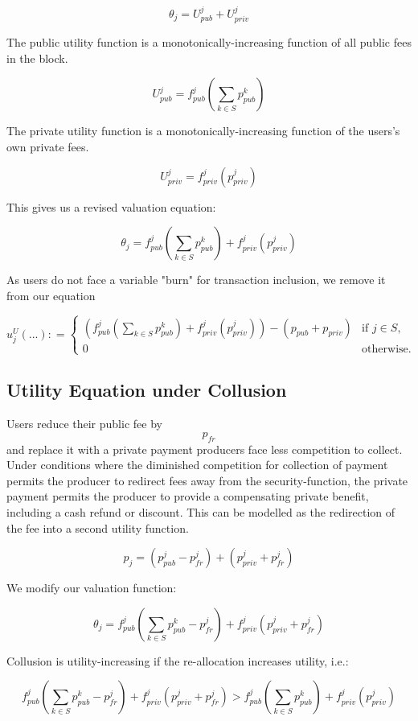 \documentclass[oneside]{article}   	%
\begin{document}
$$
\theta_j = U_{pub}^j + U_{priv}^j
$$

The public utility function is a monotonically-increasing function of all public fees in the block.

$$
U_{pub}^j = f_{pub}^j\left(\sum_{k \in S} p_{pub}^{k}\right)
$$

The private utility function is a monotonically-increasing function of the users's own private fees.

$$
U_{priv}^j = f_{priv}^j(p_{priv}^j)
$$

This gives us a revised valuation equation:

$$
\theta_j = f_{pub}^j\left(\sum_{k \in S} p_{pub}^{k}\right) + f_{priv}^j(p_{priv}^j)
$$

As users do not face a variable "burn" for transaction inclusion, we remove it from our equation

\[
u_j^U\left(...\right) : =
\begin{cases}
\left(
	f_{pub}^j
		\left(\sum_{k \in S} p_{pub}^{k}\right) 
		+ f_{priv}^j(p_{priv}^j) 
\right)  -   \left(p_{pub} + p_{priv}\right) & \text{if } j \in S, \\ 0 & \text{otherwise.}
\end{cases}
\]

\subsection*{Utility Equation under Collusion}

Users reduce their public fee by $$p_{fr}$$ and replace it with a private payment producers face less competition to collect. Under conditions where the diminished competition for collection of payment permits the producer to redirect fees away from the security-function, the private payment permits the producer to provide a compensating private benefit, including a cash refund or discount. This can be modelled as the redirection of the fee into a second utility function.

$$
p_j = \left( p_{pub}^j - p_{fr}^j \right) + \left( p_{priv}^j + p_{fr}^j \right)
$$

We modify our valuation function:

$$
\theta_j = f_{pub}^j\left(\sum_{k \in S} p_{pub}^{k} - p_{fr}^j \right) + f_{priv}^j( p_{priv}^j + p_{fr}^j )
$$

Collusion is utility-increasing if the re-allocation increases utility, i.e.:

\[
f_{pub}^j\left(\sum_{k \in S} p_{pub}^{k} - p_{fr}^j \right) + f_{priv}^j( p_{priv}^j + p_{fr}^j )
> 
f_{pub}^j\left(\sum_{k \in S} p_{pub}^{k}\right) + f_{priv}^j(p_{priv}^j)
\]
\end{document}

